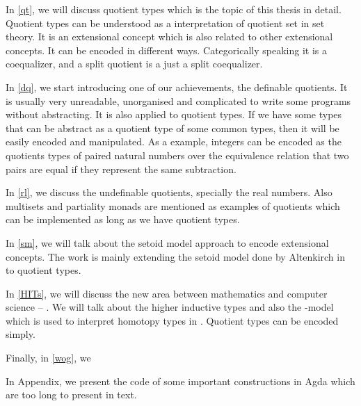 In \autoref{qt}, we will discuss quotient types which is the topic of
this thesis in detail. Quotient types
can be understood as a interpretation of quotient set in set
theory. It is an extensional concept which is also related to other extensional concepts. It can be encoded in different ways. Categorically speaking it
is a coequalizer, and a split quotient is a just a split coequalizer.


In \autoref{dq}, we start introducing one of our achievements, the
definable quotients. It is usually very unreadable, unorganised and
complicated to write some programs without abstracting. It is also
applied to quotient types. If we have some types that can be abstract
as a quotient type of some common types, then it will be easily
encoded and manipulated. As a example, integers can be encoded as the
quotients types of paired natural numbers over the equivalence
relation that two pairs are equal if they represent the same
subtraction.

In \autoref{rl}, we discuss the undefinable quotients, specially the
real numbers. Also multisets and partiality monads are mentioned as
examples of quotients which can be implemented as long as we have
quotient types. 


In \autoref{sm}, we will talk about the setoid model approach to encode
extensional concepts. The work is mainly extending the setoid model
done by Altenkirch in \cite{alti:lics99} to
quotient types.


In \autoref{HITs}, we will discuss the new area between mathematics and
computer science -- \hott. We will talk about the higher inductive
types and also the \wog-model which is used to interpret
homotopy types in \itt. Quotient types can be encoded \hott simply.


Finally, in \autoref{wog}, we



In Appendix, we present the code of some important constructions in
Agda which are too long to present in text.
